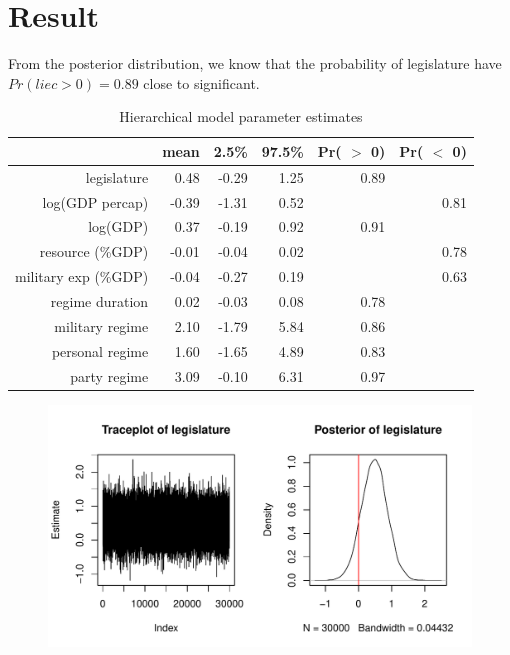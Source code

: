 \section{Result}

From the posterior distribution, we know that the probability of legislature have$Pr(liec > 0) = 0.89$ close to significant.

\begin{table}[ht]
\centering
\begin{tabular}{rrrrrr}
  \hline
 & mean & 2.5\% & 97.5\% & Pr( $>$ 0) & Pr( $<$ 0) \\ 
  \hline
legislature & 0.48 & -0.29 & 1.25 & 0.89 &  \\ 
  log(GDP percap) & -0.39 & -1.31 & 0.52 &  & 0.81 \\ 
  log(GDP) & 0.37 & -0.19 & 0.92 & 0.91 &  \\ 
  resource (\%GDP) & -0.01 & -0.04 & 0.02 &  & 0.78 \\ 
  military exp (\%GDP) & -0.04 & -0.27 & 0.19 &  & 0.63 \\ 
  regime duration & 0.02 & -0.03 & 0.08 & 0.78 &  \\ 
  military regime & 2.10 & -1.79 & 5.84 & 0.86 &  \\ 
  personal regime & 1.60 & -1.65 & 4.89 & 0.83 &  \\ 
  party regime & 3.09 & -0.10 & 6.31 & 0.97 &  \\ 
   \hline
\end{tabular}
\caption{Hierarchical model parameter estimates}
\label{tab:hierarchical_estimate}
\end{table}

\begin{figure}[ht]
    \centering
    \includegraphics[width=\textwidth]{../fig/mcmc_legis}
    \label{fig:mcmc_legis}
\end{figure}
